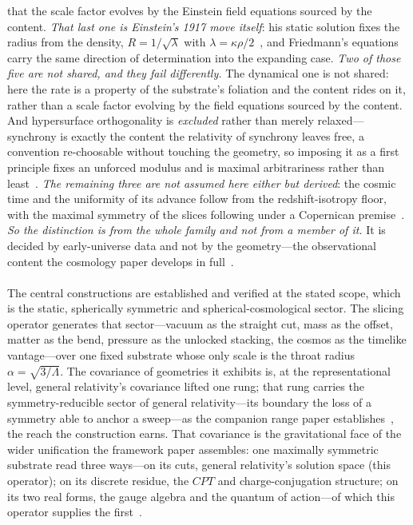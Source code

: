 \documentclass[11pt,a4paper]{article}
\theoremstyle{definition}
\begin{document}
that the scale factor evolves by the Einstein field equations sourced by the content. \emph{That last one is Einstein's 1917 move itself}: his static solution fixes the radius from the density, $R=1/\sqrt{\lambda}$ with $\lambda=\kappa\rho/2$~\cite{Einstein1917}, and Friedmann's equations carry the same direction of determination into the expanding case. \emph{Two of those five are not shared, and they fail differently.} The dynamical one is not shared: here the rate is a property of the substrate's foliation and the content rides on it, rather than a scale factor evolving by the field equations sourced by the content. And hypersurface orthogonality is \emph{excluded} rather than merely relaxed---synchrony is exactly the content the relativity of synchrony leaves free, a convention re-choosable without touching the geometry, so imposing it as a first principle fixes an unforced modulus and is maximal arbitrariness rather than least~\cite{JanzenCRframework,JanzenShadowExistence}. \emph{The remaining three are not assumed here either but derived}: the cosmic time and the uniformity of its advance follow from the redshift-isotropy floor, with the maximal symmetry of the slices following under a Copernican premise~\cite{JanzenModernParallax}. \emph{So the distinction is from the whole family and not from a member of it.} It is decided by early-universe data and not by the geometry---the observational content the cosmology paper develops in full~\cite{JanzenCRcosmology}.

\paragraph{}
The central constructions are established and verified at the stated scope, which is the static, spherically symmetric and spherical-cosmological sector. The slicing operator generates that sector---vacuum as the straight cut, mass as the offset, matter as the bend, pressure as the unlocked stacking, the cosmos as the timelike vantage---over one fixed substrate whose only scale is the throat radius $\alpha=\sqrt{3/\Lambda}$. The covariance of geometries it exhibits is, at the representational level, general relativity's covariance lifted one rung; that rung carries the symmetry-reducible sector of general relativity---its boundary the loss of a symmetry able to anchor a sweep---as the companion range paper establishes~\cite{JanzenRange}, the reach the construction earns. That covariance is the gravitational face of the wider unification the framework paper assembles: one maximally symmetric substrate read three ways---on its cuts, general relativity's solution space (this operator); on its discrete residue, the $CPT$ and charge-conjugation structure; on its two real forms, the gauge algebra and the quantum of action---of which this operator supplies the first~\cite{JanzenCRframework}.
\end{document}
